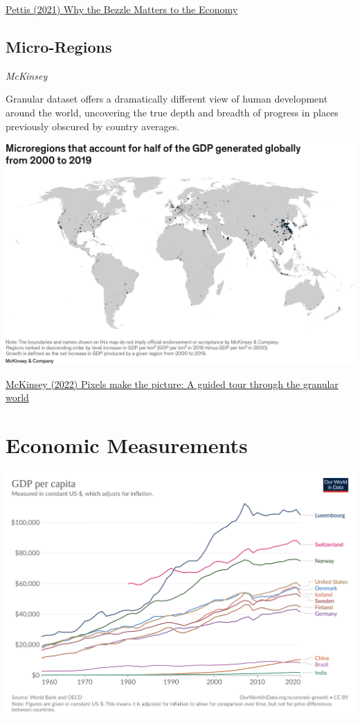 \documentclass[
]{book}
\begin{document}
\href{https://carnegieendowment.org/chinafinancialmarkets/85179}{Pettis (2021) Why the Bezzle Matters to the Economy}

\hypertarget{micro-regions}{%
\section{Micro-Regions}\label{micro-regions}}

\emph{McKinsey}

Granular dataset offers a dramatically different view of human development around the world, uncovering the true depth and breadth of progress in places previously obscured by country averages.

\includegraphics{fig/gdp_microregions.png}

\href{https://www.mckinsey.com/mgi/our-research/Pixels-of-progress-chapter-1}{McKinsey (2022) Pixels make the picture: A guided tour through the granular world}

\hypertarget{economic-measurements}{%
\chapter{Economic Measurements}\label{economic-measurements}}

\includegraphics{fig/gdp-per-capita-in-us-dollar-world-bank.png}
\end{document}

